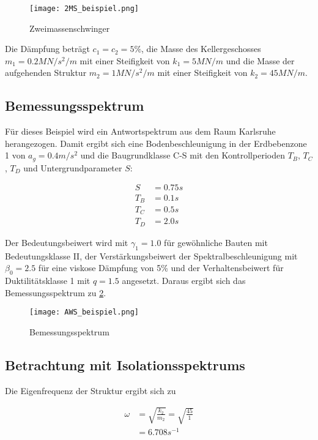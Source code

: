 \begin{figure}[ht]
    \centering
    \texttt{[image: 2MS\_beispiel.png]}
    \caption{Zweimassenschwinger}
    \label{fig:2ms}
\end{figure}

Die Dämpfung beträgt $c_1 = c_2 = 5\%$, die Masse des Kellergeschosses $m_1 = 0.2 MN/s^2/m$ mit einer Steifigkeit von $k_1 = 5 MN/m$ und die Masse der aufgehenden Struktur $m_2 = 1 MN/s^2/m$ mit einer Steifigkeit von $k_2 = 45 MN/m$.

\subsection{Bemessungsspektrum}

Für dieses Beispiel wird ein Antwortspektrum aus dem Raum Karlsruhe herangezogen. Damit ergibt sich eine Bodenbeschleunigung in der Erdbebenzone 1 von $a_g = 0.4 m/s^2$ und die Baugrundklasse C-S mit den Kontrollperioden $T_B$, $T_C$, $T_D$ und Untergrundparameter $S$:

\begin{align*}
S &= 0.75 s\\
T_B &= 0.1 s\\
T_C &= 0.5 s\\
T_D &= 2.0 s
\end{align*}

Der Bedeutungsbeiwert wird mit $\gamma_1 = 1.0$ für gewöhnliche Bauten mit Bedeutungsklasse II, der Verstärkungsbeiwert der Spektralbeschleunigung mit $\beta_0 = 2.5$ für eine viskose Dämpfung von 5\% und der Verhaltensbeiwert für Duktilitätsklasse 1 mit $q = 1.5$ angesetzt.
Daraus ergibt sich das Bemessungsspektrum zu \cref{fig:Bemessungsspektrum}.

\begin{figure}[ht] 
    \centering
    \texttt{[image: AWS\_beispiel.png]}
    \caption{Bemessungsspektrum}
    \label{fig:Bemessungsspektrum}
\end{figure}

\subsection{Betrachtung mit Isolationsspektrums}

Die Eigenfrequenz der Struktur ergibt sich zu

\begin{align*}
\omega &= \sqrt{\frac{k_2}{m_2}} = \sqrt{\frac{45}{1}}\\
       &= 6.708 s^{-1}
\end{align*}

